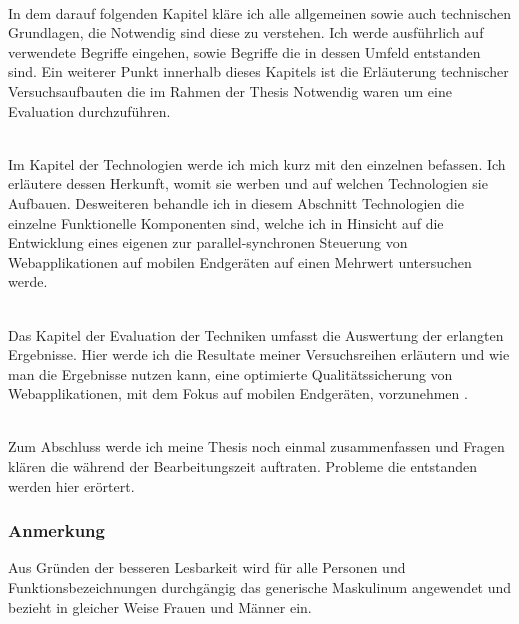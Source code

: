 \\In dem darauf folgenden Kapitel kläre ich alle allgemeinen sowie auch technischen Grundlagen, die Notwendig sind diese  zu verstehen. Ich werde ausführlich auf verwendete Begriffe eingehen, sowie Begriffe die in dessen Umfeld entstanden sind. Ein weiterer Punkt innerhalb dieses Kapitels ist die Erläuterung technischer Versuchsaufbauten die im Rahmen der Thesis Notwendig waren um eine Evaluation durchzuführen.

\\Im Kapitel der Technologien werde ich mich kurz mit den einzelnen  befassen. Ich erläutere dessen Herkunft, womit sie werben und auf welchen Technologien sie Aufbauen. Desweiteren behandle ich in diesem Abschnitt Technologien die einzelne Funktionelle Komponenten sind, welche ich in Hinsicht auf die Entwicklung eines eigenen  zur parallel-synchronen Steuerung von Webapplikationen auf mobilen Endgeräten auf einen Mehrwert untersuchen werde.

\\Das Kapitel der Evaluation der Techniken umfasst die Auswertung der erlangten Ergebnisse. Hier werde ich die Resultate meiner Versuchsreihen erläutern und wie man die Ergebnisse nutzen kann, eine optimierte Qualitätssicherung von Webapplikationen, mit dem Fokus auf mobilen Endgeräten, vorzunehmen .

\\Zum Abschluss werde ich meine Thesis noch einmal zusammenfassen und Fragen klären die während der Bearbeitungszeit auftraten. Probleme die entstanden werden hier erörtert.

\vfill
\subsubsection{Anmerkung}
Aus Gründen der besseren Lesbarkeit wird für alle Personen und Funktionsbezeichnungen durchgängig das generische Maskulinum angewendet und bezieht in gleicher Weise Frauen und Männer ein.